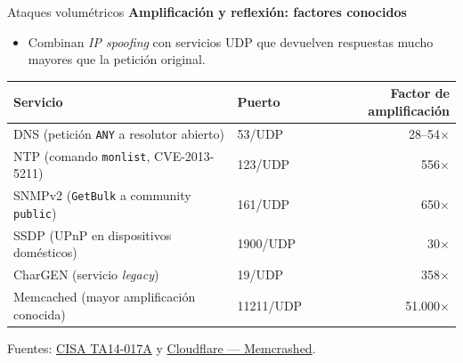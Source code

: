 \documentclass[aspectratio=169,11pt]{beamer}
\newcommand{\cmd}[1]{\texttt{\color{uznavy}#1}}
\newcommand{\subt}[1]{{\color{uznavy}\bfseries #1}\par\smallskip}
\begin{document}
\begin{frame}{Ataques volumétricos}
\small
\subt{Amplificación y reflexión: factores conocidos}
  \begin{itemize}
  \item Combinan \emph{IP spoofing} con servicios UDP que devuelven respuestas mucho mayores que la petición original.
  \end{itemize}
\vspace{0.3em}
\begin{center}
\footnotesize
\begin{tabular}{@{}llr@{}}
\toprule
\textbf{Servicio} & \textbf{Puerto} & \textbf{Factor de amplificación} \\
\midrule
DNS (petición \cmd{ANY} a resolutor abierto) & 53/UDP    & 28--54$\times$ \\
NTP (comando \cmd{monlist}, CVE-2013-5211)   & 123/UDP   & 556$\times$ \\
SNMPv2 (\cmd{GetBulk} a community \cmd{public}) & 161/UDP & 650$\times$ \\
SSDP (UPnP en dispositivos domésticos)       & 1900/UDP  & 30$\times$ \\
CharGEN (servicio \emph{legacy})             & 19/UDP    & 358$\times$ \\
Memcached (mayor amplificación conocida)     & 11211/UDP & 51.000$\times$ \\
\bottomrule
\end{tabular}
\end{center}
\vspace{0.3em}
{\footnotesize Fuentes: \href{https://us-cert.cisa.gov/ncas/alerts/TA14-017A}{CISA TA14-017A} y \href{https://blog.cloudflare.com/memcrashed-major-amplification-attacks-from-port-11211/}{Cloudflare --- Memcrashed}.}
\end{frame}
\end{document}
